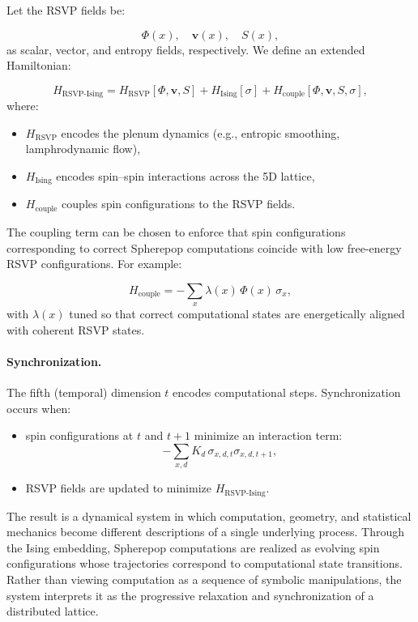 \documentclass[12pt,letterpaper]{article}
\theoremstyle{remark}
\begin{document}
Let the RSVP fields be:

\[
\Phi(x), \quad \mathbf{v}(x), \quad S(x),
\]
as scalar, vector, and entropy fields, respectively. We define an extended Hamiltonian:

\[
H_{\text{RSVP-Ising}} = H_{\text{RSVP}}[\Phi, \mathbf{v}, S]
+ H_{\text{Ising}}[\sigma]
+ H_{\text{couple}}[\Phi, \mathbf{v}, S, \sigma],
\]
where:

\begin{itemize}
  \item $H_{\text{RSVP}}$ encodes the plenum dynamics (e.g., entropic smoothing, lamphrodynamic flow),
  \item $H_{\text{Ising}}$ encodes spin--spin interactions across the 5D lattice,
  \item $H_{\text{couple}}$ couples spin configurations to the RSVP fields.
\end{itemize}

The coupling term can be chosen to enforce that spin configurations corresponding to correct Spherepop computations coincide with low free-energy RSVP configurations. For example:

\[
H_{\text{couple}} = -\sum_x \lambda(x)\, \Phi(x)\, \sigma_x,
\]
with $\lambda(x)$ tuned so that correct computational states are energetically aligned with coherent RSVP states.

\paragraph{Synchronization.}
The fifth (temporal) dimension $t$ encodes computational steps. Synchronization occurs when:

\begin{itemize}
  \item spin configurations at $t$ and $t+1$ minimize an interaction term:
  \[
  -\sum_{x,d} K_{d}\, \sigma_{x,d,t} \sigma_{x,d,t+1},
  \]
  \item RSVP fields are updated to minimize $H_{\text{RSVP-Ising}}$.
\end{itemize}

The result is a dynamical system in which computation, geometry, and statistical mechanics become different descriptions of a single underlying process. Through the Ising embedding, Spherepop computations are realized as evolving spin configurations whose trajectories correspond to computational state transitions. Rather than viewing computation as a sequence of symbolic manipulations, the system interprets it as the progressive relaxation and synchronization of a distributed lattice.
\end{document}
